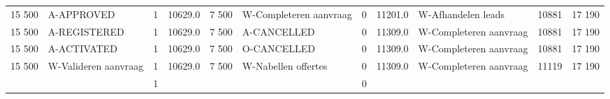 \begin{tabular}{rlrlrlrllll}
15 500 & A-APPROVED & 1 & 10629.0 & 7 500 & W-Completeren aanvraag & 0 & 11201.0 & W-Afhandelen leads & 10881 & 17 190 \\
15 500 & A-REGISTERED & 1 & 10629.0 & 7 500 & A-CANCELLED & 0 & 11309.0 & W-Completeren aanvraag & 10881 & 17 190 \\
15 500 & A-ACTIVATED & 1 & 10629.0 & 7 500 & O-CANCELLED & 0 & 11309.0 & W-Completeren aanvraag & 10881 & 17 190 \\
15 500 & W-Valideren aanvraag & 1 & 10629.0 & 7 500 & W-Nabellen offertes & 0 & 11309.0 & W-Completeren aanvraag & 11119 & 17 190 \\
 &  & 1 &  &  &  & 0 &  &  &  &  \\
\bottomrule
\end{tabular}
